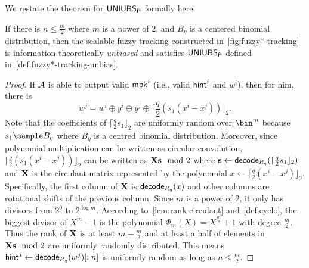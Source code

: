 We restate the theorem for $\mathsf{UNIUBS}_\mathsf{f^s}$ formally here.
\begin{theorem}
\label{thm:unbias}
If there is $n\le \frac{m}{2}$ where $m$ is a power of $2$, and $B_\eta$ is a centered binomial distribution,
then the scalable fuzzy tracking constructed in~\cref{fig:fuzzy*-tracking} is information theoretically \emph{unbiased} and satisfies $\mathsf{UNIUBS}_\mathsf{f^s}$ defined in~\cref{def:fuzzy*-tracking-unbias}. 
\end{theorem}
\begin{proof}
If $\mathcal{A}$ is able to output valid $\mathsf{mpk}^i$ (i.e., valid $\mathsf{hint}^i$ and $w^i$), then for him, there is
$$w^j = w^i\oplus y^i\oplus y^j\oplus \lceil\frac{q}{2}(s_1(x^i-x^j))\rfloor_2.$$
Note that the coefficients of $\lceil\frac{q}{2}s_1\rfloor_2$ are uniformly random over $\bin^m$ because $s_1\sample B_\eta$ where $B_\eta$ is a centred binomial distribution. Moreover, since polynomial multiplication can be written as circular convolution, $\lceil\frac{q}{2}(s_1(x^i-x^j))\rfloor_2$ can be written as $\mathbf{X}\mathbf{s} \mod 2$ where $\mathbf{s}\gets\mathsf{decode}_{R_q}(\lceil\frac{q}{2}s_1\rfloor_2)$ and $\mathbf{X}$ is the circulant matrix represented by the polynomial $x\gets\lceil\frac{q}{2}(x^i-x^j)\rfloor_2$. Specifically, the first column of $\mathbf{X}$ is $\mathsf{decode}_{R_q}(x)$ and other columns are rotational shifts of the previous column. 
Since $m$ is a power of $2$, it only has divisors from $2^0$ to $2^{\log m}$. According to~\cref{lem:rank-circulant} and~\cref{def:cyclo}, the biggest divisor of $X^m-1$ is the polynomial $\Phi_m(X)=X^{\frac{m}{2}}+1$ with degree $\frac{m}{2}$. Thus the rank of $\mathbf{X}$ is at least $m-\frac{m}{2}$ and at least a half of elements in $\mathbf{X}\mathbf{s} \mod 2$ are uniformly randomly distributed. This means $\mathsf{hint}^j\gets \mathsf{decode}_{R_q}(w^j)[:n]$ is uniformly random as long as $n\le \frac{m}{2}$.
\end{proof}

